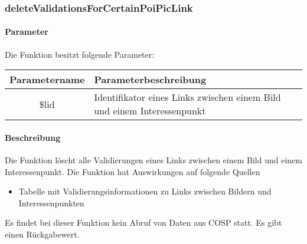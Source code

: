 \subsubsection{deleteValidationsForCertainPoiPicLink}
\paragraph{Parameter} Die Funktion besitzt folgende Parameter:
\begin{table}[H]
	\begin{tabular}{|c|p{11cm}|}
		\hline
		\textbf{Parametername} & \textbf{Parameterbeschreibung} \\ \hline
		\$lid & Identifikator eines Links zwischen einem Bild und einem Interessenpunkt \\ \hline
	\end{tabular}
\end{table}
\paragraph{Beschreibung} Die Funktion löscht alle Validierungen eines Links zwischen einem Bild und einem Interessenpunkt. Die Funktion hat Auswirkungen auf folgende Quellen
\begin{itemize}
	\item Tabelle mit Validierungsinformationen zu Links zwischen Bildern und Interessenpunkten
\end{itemize}
Es findet bei dieser Funktion kein Abruf von Daten aus {\glqq COSP\grqq} statt. Es gibt einen Rückgabewert.